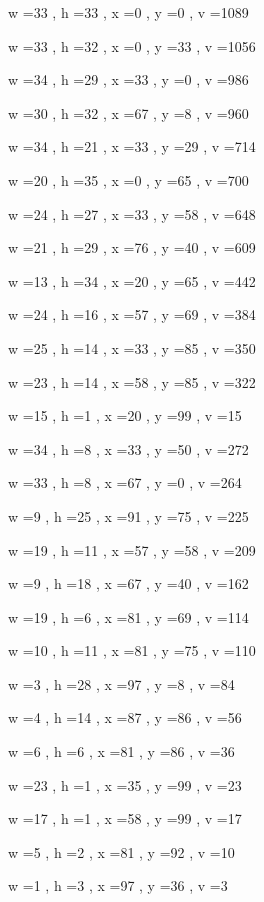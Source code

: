 \documentclass[11pt]{article}
\begin{document}
w =33 , h =33 , x =0 , y =0 , v =1089
\par
w =33 , h =32 , x =0 , y =33 , v =1056
\par
w =34 , h =29 , x =33 , y =0 , v =986
\par
w =30 , h =32 , x =67 , y =8 , v =960
\par
w =34 , h =21 , x =33 , y =29 , v =714
\par
w =20 , h =35 , x =0 , y =65 , v =700
\par
w =24 , h =27 , x =33 , y =58 , v =648
\par
w =21 , h =29 , x =76 , y =40 , v =609
\par
w =13 , h =34 , x =20 , y =65 , v =442
\par
w =24 , h =16 , x =57 , y =69 , v =384
\par
w =25 , h =14 , x =33 , y =85 , v =350
\par
w =23 , h =14 , x =58 , y =85 , v =322
\par
w =15 , h =1 , x =20 , y =99 , v =15
\par
w =34 , h =8 , x =33 , y =50 , v =272
\par
w =33 , h =8 , x =67 , y =0 , v =264
\par
w =9 , h =25 , x =91 , y =75 , v =225
\par
w =19 , h =11 , x =57 , y =58 , v =209
\par
w =9 , h =18 , x =67 , y =40 , v =162
\par
w =19 , h =6 , x =81 , y =69 , v =114
\par
w =10 , h =11 , x =81 , y =75 , v =110
\par
w =3 , h =28 , x =97 , y =8 , v =84
\par
w =4 , h =14 , x =87 , y =86 , v =56
\par
w =6 , h =6 , x =81 , y =86 , v =36
\par
w =23 , h =1 , x =35 , y =99 , v =23
\par
w =17 , h =1 , x =58 , y =99 , v =17
\par
w =5 , h =2 , x =81 , y =92 , v =10
\par
w =1 , h =3 , x =97 , y =36 , v =3
\par
\newpage
\end{document}
